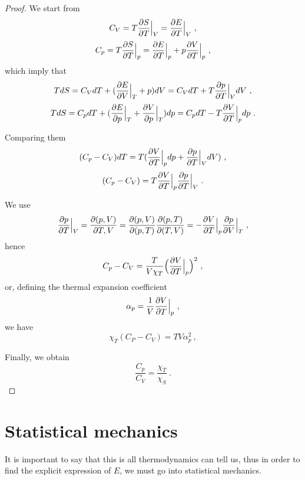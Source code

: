     \begin{proof}
        We start from
        \begin{equation*}
            C_V = T \frac{\partial S}{\partial T} \Big \vert_V = \frac{\partial E}{\partial T} \Big \vert_V ~,
        \end{equation*}
        \begin{equation*}
            C_p = T \frac{\partial S}{\partial T} \Big \vert_p = \frac{\partial E}{\partial T} \Big \vert_p + p \frac{\partial V}{\partial T} \Big \vert_p  ~,
        \end{equation*}
        which imply that 
        \begin{equation*}
            T dS = C_V dT + ( \frac{\partial E}{\partial V} \Big \vert_{T} + p) dV = C_V dT + T \frac{\partial p}{\partial T} \Big \vert_V dV ~,
        \end{equation*}
        \begin{equation*}
            T dS = C_p dT + ( \frac{\partial E}{\partial p} \Big \vert_T + \frac{\partial V}{\partial p} \Big \vert_T ) dp = C_p dT - T \frac{\partial V}{\partial T} \Big \vert_p dp ~.
        \end{equation*}

        Comparing them 
        \begin{equation*}
            (C_p - C_V) dT = T (\frac{\partial V}{\partial T} \Big \vert_p dp + \frac{\partial p}{\partial T} \Big \vert_V dV) ~,
        \end{equation*}
        \begin{equation*}
            (C_p - C_V) = T \frac{\partial V}{\partial T} \Big \vert_p \frac{\partial p}{\partial T} \Big \vert_V ~.
        \end{equation*}

        We use 
        \begin{equation*}
            \frac{\partial p}{\partial T} \Big \vert_V = \frac{\partial(p, V)}{\partial T, V} = \frac{\partial(p,V)}{\partial(p, T)} \frac{\partial(p, T)}{\partial(T, V)} = - \frac{\partial V}{\partial T} \Big \vert_p \frac{\partial p}{\partial V} \Big \vert_T ~,
        \end{equation*}
        hence 
        \begin{equation*}
            C_p - C_V = \frac{T}{V \chi_T} \Big ( \frac{\partial V}{\partial T} \Big \vert_p \Big)^2 ~,
        \end{equation*}
        or, defining the thermal expansion coefficient
        \begin{equation}
            \alpha_p = \frac{1}{V} \frac{\partial V}{\partial T} \Big \vert_p~,
        \end{equation}
        we have 
        \begin{equation*}
            \chi_T (C_P - C_V) = T V \alpha_p^2 ~,
        \end{equation*}

        Finally, we obtain 
        \begin{equation*}
            \frac{C_p}{C_V} = \frac{\chi_T}{\chi_S} ~.
        \end{equation*}
    \end{proof}

\section{Statistical mechanics}
    
    It is important to say that this is all thermodynamics can tell us, thus in order to find the explicit expression of $E$, we must go into statistical mechanics.
